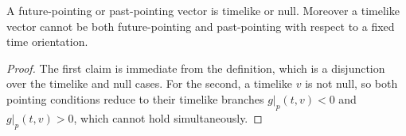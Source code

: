 \begin{lemma}
    \label{lmm:pointing-orientation}
    \leanok
    A future-pointing or past-pointing vector is timelike or null. Moreover a timelike vector cannot be both future-pointing and past-pointing with respect to a fixed time orientation.
\end{lemma}
\begin{proof}
    \leanok
    The first claim is immediate from the definition, which is a disjunction over the timelike and null cases. For the second, a timelike $v$ is not null, so both pointing conditions reduce to their timelike branches $g|_p(t,v) < 0$ and $g|_p(t,v) > 0$, which cannot hold simultaneously.
\end{proof}

